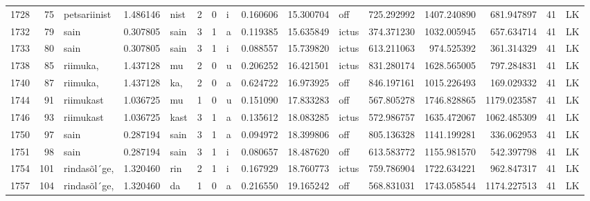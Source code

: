 \begin{tabular}{lrlrllllrrlrrrll}
1728 &          75 &     petsariinist &  1.486146 &    nist &        2 &      0 &       i &      0.160606 &     15.300704 &    off &   725.292992 &  1407.240890 &   681.947897 &     41 &        LK \\
1732 &          79 &             sain &  0.307805 &    sain &        3 &      1 &       a &      0.119385 &     15.635849 &  ictus &   374.371230 &  1032.005945 &   657.634714 &     41 &        LK \\
1733 &          80 &             sain &  0.307805 &    sain &        3 &      1 &       i &      0.088557 &     15.739820 &  ictus &   613.211063 &   974.525392 &   361.314329 &     41 &        LK \\
1738 &          85 &         riimuka, &  1.437128 &      mu &        2 &      0 &       u &      0.206252 &     16.421501 &  ictus &   831.280174 &  1628.565005 &   797.284831 &     41 &        LK \\
1740 &          87 &         riimuka, &  1.437128 &     ka, &        2 &      0 &       a &      0.624722 &     16.973925 &    off &   846.197161 &  1015.226493 &   169.029332 &     41 &        LK \\
1744 &          91 &        riimukast &  1.036725 &      mu &        1 &      0 &       u &      0.151090 &     17.833283 &    off &   567.805278 &  1746.828865 &  1179.023587 &     41 &        LK \\
1746 &          93 &        riimukast &  1.036725 &    kast &        3 &      1 &       a &      0.135612 &     18.083285 &  ictus &   572.986757 &  1635.472067 &  1062.485309 &     41 &        LK \\
1750 &          97 &             sain &  0.287194 &    sain &        3 &      1 &       a &      0.094972 &     18.399806 &    off &   805.136328 &  1141.199281 &   336.062953 &     41 &        LK \\
1751 &          98 &             sain &  0.287194 &    sain &        3 &      1 &       i &      0.080657 &     18.487620 &    off &   613.583772 &  1155.981570 &   542.397798 &     41 &        LK \\
1754 &         101 &     rindasõl´ge, &  1.320460 &     rin &        2 &      1 &       i &      0.167929 &     18.760773 &  ictus &   759.786904 &  1722.634221 &   962.847317 &     41 &        LK \\
1757 &         104 &     rindasõl´ge, &  1.320460 &      da &        1 &      0 &       a &      0.216550 &     19.165242 &    off &   568.831031 &  1743.058544 &  1174.227513 &     41 &        LK \\

\end{tabular}
